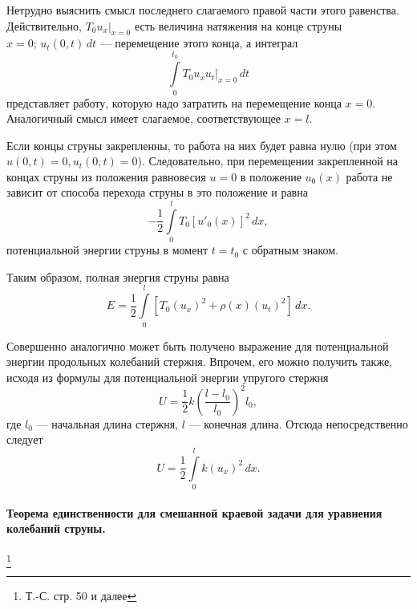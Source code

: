 Нетрудно выяснить смысл последнего слагаемого правой части этого равенства. Действительно, $T_0 u_x|_{x = 0}$ есть величина натяжения на конце струны $x = 0; \, u_t(0, t) \, dt$  --- перемещение этого конца, а интеграл 
\begin{equation}
	\int \limits_{0}^{t_0} T_0 u_x u_t|_{x = 0} \, dt
\end{equation}
представляет работу, которую надо затратить на перемещение конца $x = 0$. Аналогичный смысл имеет слагаемое, соответствующее $x = l$. 

Если концы струны закрепленны, то работа на них будет равна нулю (при этом $u(0, t) = 0, u_t(0, t) = 0$). Следовательно, при перемещении закрепленной на концах струны из положения равновесия $u = 0$ в положение $u_0(x)$ работа не зависит от способа перехода струны в это положение и равна 
\begin{equation}
	-\frac{1}{2} \int \limits_{0}^{l} T_0[u'_0(x)]^2 \, dx, 
\end{equation}
потенциальной энергии струны в момент $t = t_0$ с обратным знаком.

Таким образом, полная энергия струны равна
\begin{equation}
	E = \frac{1}{2} \int \limits_{0}^{l} [T_0(u_x)^2 + \rho(x)(u_t)^2] \, dx.
\end{equation}

Совершенно аналогично может быть получено выражение для потенциальной энергии продольных колебаний стержня. Впрочем, его можно получить также, исходя из формулы для потенциальной энергии упругого стержня
\begin{equation*}
	U = \frac{1}{2} k(\frac{l - l_0}{l_0})^2 l_0,
\end{equation*}
где $l_0$ --- начальная длина стержня, $l$ --- конечная длина. Отсюда непосредственно следует 
\begin{equation*}
	U = \frac{1}{2} \int \limits_{0}^{l} k(u_x)^2 \, dx.
\end{equation*}

\paragraph{Теорема единственности для смешанной краевой задачи для уравнения колебаний струны.}\footnote{Т.-С. стр. 50 и далее}

